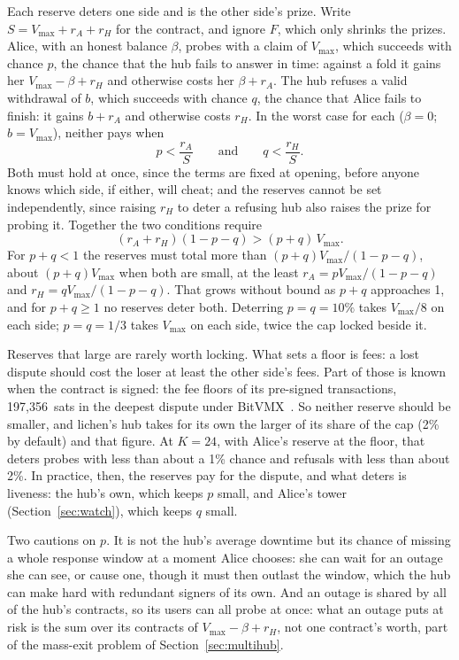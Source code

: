 \documentclass[11pt]{article}
\newcommand{\vmax}{V_{\max}}
\begin{document}
Each reserve deters one side and is the other side's prize. Write
$S = \vmax + r_A + r_H$ for the contract, and ignore $F$, which only
shrinks the prizes. Alice, with an honest balance $\beta$, probes with a
claim of $\vmax$, which succeeds with chance $p$, the chance that the hub
fails to answer in time: against a fold it gains her
$\vmax - \beta + r_H$ and otherwise costs her $\beta + r_A$. The hub
refuses a valid withdrawal of $b$, which succeeds with chance $q$, the
chance that Alice fails to finish: it gains $b + r_A$ and otherwise
costs $r_H$. In the worst case for each ($\beta = 0$; $b = \vmax$),
neither pays when
\[
  p < \frac{r_A}{S} \qquad\text{and}\qquad q < \frac{r_H}{S}.
\]
Both must hold at once, since the terms are fixed at opening, before
anyone knows which side, if either, will cheat; and the reserves cannot
be set independently, since raising $r_H$ to deter a refusing hub also
raises the prize for probing it. Together the two conditions require
\[
  (r_A + r_H)(1 - p - q) > (p + q)\,\vmax .
\]
For $p + q < 1$ the reserves must total more than
$(p + q)\vmax / (1 - p - q)$, about $(p + q)\vmax$ when both are small,
at the least $r_A = p\vmax/(1 - p - q)$ and $r_H = q\vmax/(1 - p - q)$.
That grows without bound as $p + q$ approaches 1, and for $p + q \ge 1$
no reserves deter both. Deterring $p = q = 10\%$ takes $\vmax/8$ on each
side; $p = q = 1/3$ takes $\vmax$ on each side, twice the cap locked
beside it.

Reserves that large are rarely worth locking. What sets a floor is fees:
a lost dispute should cost the loser at least the other side's fees.
Part of those is known when the contract is signed: the fee floors of
its pre-signed transactions, 197,356~sats in the deepest dispute under
BitVMX~\cite[\S 6]{lichenbitvmx}. So neither reserve should be smaller,
and lichen's hub takes for its own the larger of its share of the cap
(2\% by default) and that figure. At $K = 24$, with Alice's reserve at
the floor, that deters probes with less than about a 1\% chance and
refusals with less than about 2\%. In practice, then, the reserves pay
for the dispute, and what deters is liveness: the hub's own, which keeps
$p$ small, and Alice's tower (Section~\ref{sec:watch}), which keeps $q$
small.

Two cautions on $p$. It is not the hub's average downtime but its
chance of missing a whole response window at a moment Alice chooses:
she can wait for an outage she can see, or cause one, though it must
then outlast the window, which the hub can make hard with redundant
signers of its own. And an outage is shared by all of the hub's
contracts, so its users can all probe at once: what an outage puts at
risk is the sum over its contracts of $\vmax - \beta + r_H$, not one
contract's worth, part of the mass-exit problem of
Section~\ref{sec:multihub}.
\end{document}
